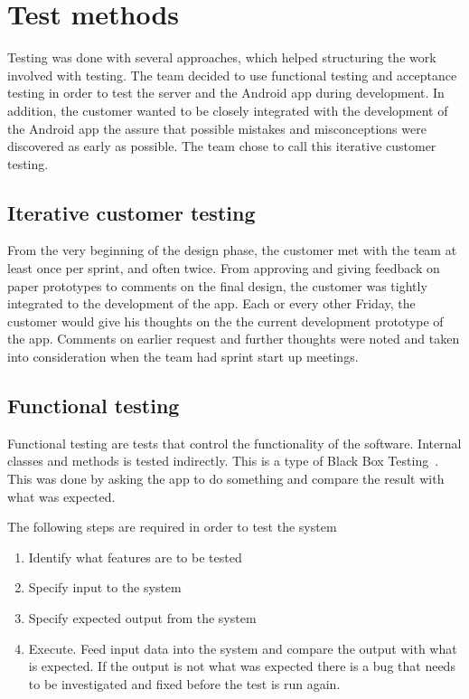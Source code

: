 \section{Test methods}
Testing was done with several approaches, which helped structuring the work involved with testing. The team decided to use functional testing and acceptance testing in order to test the server and the Android app during development. In addition, the customer wanted to be closely integrated with the development of the Android app the assure that possible mistakes and misconceptions were discovered as early as possible. The team chose to call this iterative customer testing.

\subsection{Iterative customer testing}
From the very beginning of the design phase, the customer met with the team at least once per sprint, and often twice. From approving and giving feedback on paper prototypes to comments on the final design, the customer was tightly integrated to the development of the app. Each or every other Friday, the customer would give his thoughts on the the current development prototype of the app. Comments on earlier request and further thoughts were noted and taken into consideration when the team had sprint start up meetings. 

\subsection{Functional testing}
\label{sec:funcTest}
Functional testing are tests that control the functionality of the software. Internal classes and methods is tested indirectly. This is a type of Black Box Testing~\cite{blackbox}.  This was done by asking the app to do something and compare the result with what was expected.

The following steps are required in order to test the system
\begin{enumerate}
\item Identify what features are to be tested
\item Specify input to the system
\item Specify expected output from the system
\item Execute. Feed input data into the system and compare the output with what is expected. If the output is not what was expected there is a bug that needs to be investigated and fixed before the test is run again.
\end{enumerate}

